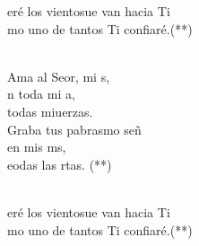 \begin{cancion}[Hacia Ti][Ixcís]
\begin{chorus}
	eré los vientosue van hacia Ti\\
	mo uno de tantos Ti confiaré.(**)\\
	\end{chorus}%
	\jump\\
	Ama al Seor, mi s, \\
	n toda mi a, \\
	 todas miuerzas.\\
	Graba tus pabrasmo señ  \\
	en mis ms, \\
	eodas las rtas. (**)\\\jump\\
	\begin{chorus}%
	eré los vientosue van hacia Ti\\
	mo uno de tantos Ti confiaré.(**)\\
	\end{chorus}%
	\jump\\
\end{cancion}%
